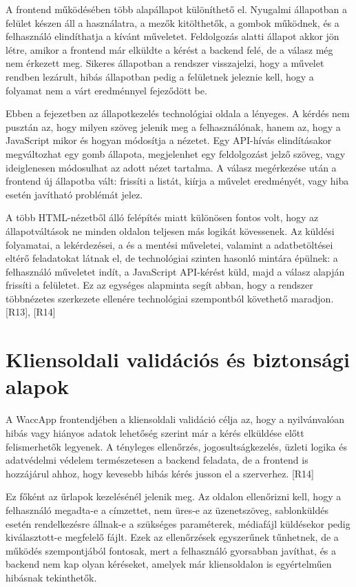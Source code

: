 A frontend működésében több alapállapot különíthető el. Nyugalmi állapotban a felület készen áll a használatra, a mezők kitölthetők, a gombok működnek, és a felhasználó elindíthatja a kívánt műveletet. Feldolgozás alatti állapot akkor jön létre, amikor a frontend már elküldte a kérést a backend felé, de a válasz még nem érkezett meg. Sikeres állapotban a rendszer visszajelzi, hogy a művelet rendben lezárult, hibás állapotban pedig a felületnek jeleznie kell, hogy a folyamat nem a várt eredménnyel fejeződött be.

Ebben a fejezetben az állapotkezelés technológiai oldala a lényeges. A kérdés nem pusztán az, hogy milyen szöveg jelenik meg a felhasználónak, hanem az, hogy a JavaScript mikor és hogyan módosítja a nézetet. Egy API-hívás elindításakor megváltozhat egy gomb állapota, megjelenhet egy feldolgozást jelző szöveg, vagy ideiglenesen módosulhat az adott nézet tartalma. A válasz megérkezése után a frontend új állapotba vált: frissíti a listát, kiírja a művelet eredményét, vagy hiba esetén javítható problémát jelez.

A több HTML-nézetből álló felépítés miatt különösen fontos volt, hogy az állapotváltások ne minden oldalon teljesen más logikát kövessenek. Az  küldési folyamatai, a  lekérdezései, a  és a  mentési műveletei, valamint a  adatbetöltései eltérő feladatokat látnak el, de technológiai szinten hasonló mintára épülnek: a felhasználó műveletet indít, a JavaScript API-kérést küld, majd a válasz alapján frissíti a felületet. Ez az egységes alapminta segít abban, hogy a rendszer többnézetes szerkezete ellenére technológiai szempontból követhető maradjon. [R13], [R14]

\section{Kliensoldali validációs és biztonsági alapok}

A WaccApp frontendjében a kliensoldali validáció célja az, hogy a nyilvánvalóan hibás vagy hiányos adatok lehetőség szerint már a kérés elküldése előtt felismerhetők legyenek. A tényleges ellenőrzés, jogosultságkezelés, üzleti logika és adatvédelmi védelem természetesen a backend feladata, de a frontend is hozzájárul ahhoz, hogy kevesebb hibás kérés jusson el a szerverhez. [R14]

Ez főként az űrlapok kezelésénél jelenik meg. Az  oldalon ellenőrizni kell, hogy a felhasználó megadta-e a címzettet, nem üres-e az üzenetszöveg, sablonküldés esetén rendelkezésre állnak-e a szükséges paraméterek, médiafájl küldésekor pedig kiválasztott-e megfelelő fájlt. Ezek az ellenőrzések egyszerűnek tűnhetnek, de a működés szempontjából fontosak, mert a felhasználó gyorsabban javíthat, és a backend nem kap olyan kéréseket, amelyek már kliensoldalon is egyértelműen hibásnak tekinthetők.

